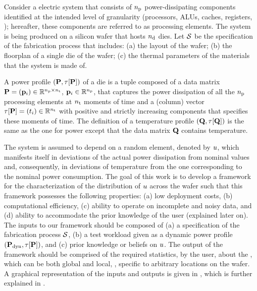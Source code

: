 Consider a electric system that consists of ${n_\text{p}}$ power-dissipating components identified at the intended level of granularity (processors, ALUs, caches, registers, \etc); hereafter, these components are referred to as processing elements.
The system is being produced on a silicon wafer that hosts ${n_\text{d}}$ dies.
Let $\mathcal{S}$ be the specification of the fabrication process that includes: (a) the layout of the wafer; (b) the floorplan of a single die of the wafer; (c) the thermal parameters of the materials that the system is made of.

A power profile $\profileP$ of a die is a tuple composed of a data matrix $\mathbf{P} = (\mathbf{p}_i) \in \mathbb{R}^{{n_\text{p}} \times {n_\text{t}}}$, $\mathbf{p}_i \in \mathbb{R}^{n_\text{p}}$, that captures the power dissipation of all the ${n_\text{p}}$ processing elements at ${n_\text{t}}$ moments of time and a (column) vector $\tau[\mathbf{P}] = (t_i) \in \mathbb{R}^{{n_\text{t}}}$ with positive and strictly increasing components that specifies these moments of time.
The definition of a temperature profile $\profileT$ is the same as the one for power except that the data matrix $\mathbf{Q}$ contains temperature.

The system is assumed to depend on a random element, denoted by $u$, which manifests itself in deviations of the actual power dissipation from nominal values and, consequently, in deviations of temperature from the one corresponding to the nominal power consumption.
The goal of this work is to develop a framework for the characterization of the distribution of $u$ across the wafer such that this framework possesses the following properties: (a) low deployment costs, (b) computational efficiency, (c) ability to operate on incomplete and noisy data, and (d) ability to accommodate the prior knowledge of the user (explained later on).
The inputs to our framework should be composed of (a) a specification of the fabrication process $\mathcal{S}$, (b) a test workload given as a dynamic power profile $(\mathbf{P}_{\text{dyn}}, \tau[\mathbf{P}])$, and (c) prior knowledge or beliefs on $u$.
The output of the framework should be comprised of the required statistics, by the user, about the \qoi, which can be both global and local, \ie, specific to arbitrary locations on the wafer.
A graphical representation of the inputs and outputs is given in , which is further explained in .

